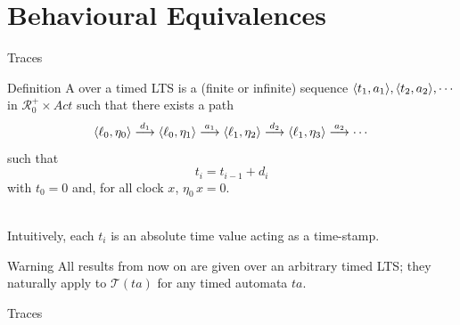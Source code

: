 \documentclass[aspectratio=169]{beamer}
\def\R{\mathcal{R}}
\def\TL#1{\mathcal{T}(#1)}
\begin{document}



\frame[plain]{\titlepage}


\section{Behavioural Equivalences}

\begin{slide}{Traces}
\small

\begin{block}{Definition}
A  over a \alert{timed LTS} is a (finite or infinite) sequence  $\mathopen{\langle}t_1,a_1\mathclose{\rangle}, \mathopen{\langle}t_2,a_2\mathclose{\rangle}, \cdots$ in
 $\R^+_0 \times Act$ such that there exists a path
\begin{equation*}
\mathopen{\langle}\ell_0,\eta_0\mathclose{\rangle}  \stackrel{d_1}{\longrightarrow}   \mathopen{\langle}\ell_0,\eta_1\mathclose{\rangle}    \stackrel{a_1}{\longrightarrow}     \mathopen{\langle}\ell_1,\eta_2\mathclose{\rangle}    \stackrel{d_2}{\longrightarrow}    \mathopen{\langle}\ell_1,\eta_3\mathclose{\rangle}   \stackrel{a_2}{\longrightarrow} \cdots 
\end{equation*}
such that 
\begin{equation*}
t_{i} = t_{i-1} + d_i
\end{equation*}
with $t_0=0$ and, for all clock $x$, $\eta_0\, x = 0$.
\end{block}
~\\

Intuitively, each $t_i$ is an absolute time value acting as a \alert{time-stamp}.

\begin{alertblock}{Warning}
All results from now on are given over an arbitrary \alert{timed LTS}; they naturally apply to $\TL{ta}$ for any timed automata $ta$.
\end{alertblock}
\end{slide}



\begin{frame}{Traces}
\end{frame}
\end{document}
